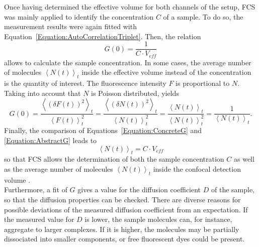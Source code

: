 Once having determined the effective volume for both channels of the setup, \gls{FCS} was mainly applied to identify the concentration $C$ of a sample. To do so, the measurement results were again fitted with Equation~\eqref{Equation:AutoCorrelationTriplet}. Then, the relation
\begin{equation} \label{Equation:ConcreteG}
	G(0) = \frac{1}{C \cdot V_{eff}}
\end{equation}
allows to calculate the sample concentration. In some cases, the average number of molecules $\left\langle N(t) \right\rangle_t$ inside the effective volume instead of the concentration is the quantity of interest. The fluorescence intensity $F$ is proportional to $N$. Taking into account that $N$ is Poisson distributed, yields
\begin{equation} \label{Equation:AbstractG}
	G(0) = \frac{\left\langle \left( \delta F(t) \right)^2 \right\rangle_t}{\left\langle F(t) \right\rangle_t^2} = \frac{\left\langle \left( \delta N(t) \right)^2 \right\rangle_t}{\left\langle N(t) \right\rangle_t^2} = \frac{\left\langle N(t) \right\rangle_t}{\left\langle N(t) \right\rangle_t^2} = \frac{1}{\left\langle N(t) \right\rangle_t}.
\end{equation}
Finally, the comparison of Equations~\eqref{Equation:ConcreteG} and \eqref{Equation:AbstractG} leads to
\begin{equation}
	\left\langle N(t) \right\rangle_t = C \cdot V_{eff}
\end{equation}
so that \gls{FCS} allows the determination of both the sample concentration $C$ as well as the average number of molecules $\left\langle N(t) \right\rangle_t$ inside the confocal detection volume \cite{Schwille2001}.\\ 

Furthermore, a fit of $G$ gives a value for the diffusion coefficient $D$ of the sample, so that the diffusion properties can be checked. There are diverse reasons for possible deviations of the measured diffusion coefficient from an expectation. If the measured value for $D$ is lower, the sample molecules can, for instance, aggregate to larger complexes. If it is higher, the molecules may be partially dissociated into smaller components, or free fluorescent dyes could be present.